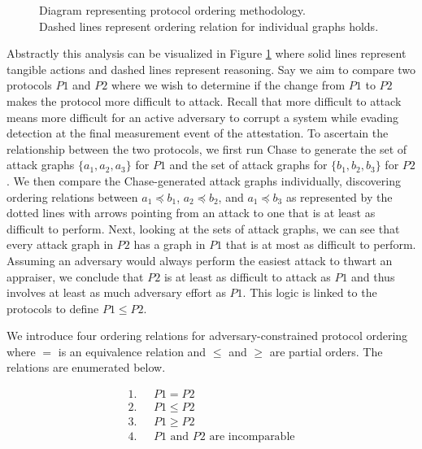 \documentclass[runningheads]{llncs}
\theoremstyle{definition}
\begin{document}
\begin{figure}[hbtp]
    \centering
    \captionsetup{justification=centering,margin=1cm}
    
    \caption[Protocol ordering abstraction]{Diagram representing protocol ordering methodology. \\ Dashed lines represent ordering relation for individual graphs holds. }
    \label{fig:protocol-org-fig}
\end{figure}

Abstractly this analysis can be visualized in Figure \ref{fig:protocol-org-fig} where solid lines represent tangible actions and dashed lines represent reasoning. Say we aim to compare two protocols $P1$ and $P2$ where we wish to determine if the change from $P1$ to $P2$ makes the protocol more difficult to attack. Recall that more difficult to attack means more difficult for an active adversary to corrupt a system while evading detection at the final measurement event of the attestation. To ascertain the relationship between the two protocols, we first run Chase to generate the set of attack graphs $\{ a_1, a_2, a_3\}$ for $P1$ and the set of attack graphs for $\{b_1, b_2, b_3\}$ for $P2$. We then compare the Chase-generated attack graphs individually, discovering ordering relations between $a_1 \preceq b_1$, $a_2 \preceq b_2$, and $a_1 \preceq b_3$ as represented by the dotted lines with arrows pointing from an attack to one that is at least as difficult to perform. Next, looking at the sets of attack graphs, we can see that every attack graph in $P2$ has a graph in $P1$ that is at most as difficult to perform. Assuming an adversary would always perform the easiest attack to thwart an appraiser, we conclude that $P2$ is at least as difficult to attack as $P1$ and thus involves at least as much adversary effort as $P1$. This logic is linked to the protocols to define $ P1 \leq P2$.  

We introduce four ordering relations for adversary-constrained protocol ordering where $=$ is an equivalence relation and $\le$ and $\ge$ are partial orders. The relations are enumerated below.

\vspace*{-5mm}

\begin{align*}
1. & \text{ } P1 = P2 \\
2. & \text{ } P1 \le P2 \\
3. & \text{ } P1 \ge P2 \\
4. & \text{ } P1 \text{ and } P2 \text{ are incomparable}
\end{align*}
\end{document}
